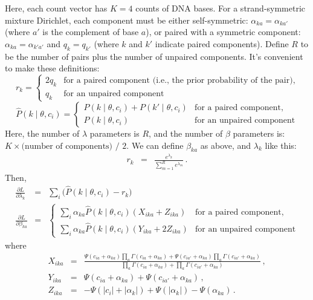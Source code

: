 \documentclass[11pt]{article}
\begin{document}
Here, each count vector has $K=4$ counts of DNA bases.  For a
strand-symmetric mixture Dirichlet, each component must be either
self-symmetric: $\alpha_{ka} = \alpha_{ka'}$ (where $a'$ is the
complement of base $a$), or paired with a symmetric component:
$\alpha_{ka} = \alpha_{k'a'}$ and $q_k = q_{k'}$ (where $k$ and $k'$
indicate paired components).  Define $R$ to be the number of pairs
plus the number of unpaired components.  It's convenient to make these
definitions:
\[
r_k = \begin{cases}
  2 q_k & \text{for a paired component (i.e., the prior probability of the pair),} \\
  q_k   & \text{for an unpaired component}
\end{cases}
\]
\[
\hat{P}(k \mid \theta, c_i) = \begin{cases}
  P(k \mid \theta, c_i) + P(k' \mid \theta, c_i) & \text{for a paired component,}\\
  P(k \mid \theta, c_i) & \text{for an unpaired component}
\end{cases}
\]
Here, the number of $\lambda$ parameters is $R$, and the number of
$\beta$ parameters is: $K \times \text{(number of components) / 2}$.
We can define $\beta_{ka}$ as above, and $\lambda_k$ like this:
\begin{eqnarray*}
  r_k & = & \frac{ e^{\lambda_k} } { \sum_{m=1}^R e^{\lambda_m} } \,.
\end{eqnarray*}
Then,
\begin{eqnarray*}
\frac{\partial L}{\partial \lambda_k} &=& \sum_i \bigl( \hat{P}(k \mid \theta, c_i) - r_k \bigr) \\
\frac{\partial L}{\partial \beta_{ka}} &=&
 \begin{cases}
\sum_i \alpha_{ka} \hat{P}(k \mid \theta, c_i)
    (X_{ika} + Z_{ika}) & \text{for a paired component,} \\
\sum_i \alpha_{ka} \hat{P}(k \mid \theta, c_i)
    (Y_{ika} + 2 Z_{ika}) & \text{for an unpaired component}
    \end{cases}
\end{eqnarray*}
where
\begin{eqnarray*}
X_{ika} & = &
\frac{ \Psi \left( c_{ia} + \alpha_{ka} \right) \prod_a \Gamma \left( c_{ia} + \alpha_{ka} \right) +
       \Psi \left( c_{ia'} + \alpha_{ka} \right) \prod_a \Gamma \left( c_{ia'} + \alpha_{ka} \right) }
     { \prod_a \Gamma \left( c_{ia} + \alpha_{ka} \right) + \prod_a \Gamma \left( c_{ia'} + \alpha_{ka} \right) } \,,\\
Y_{ika} & = & \Psi \left( c_{ia} + \alpha_{ka} \right) + \Psi \left( c_{ia'} + \alpha_{ka} \right) \,,\\
Z_{ika} & = & -  \Psi \left( | c_i | + | \alpha_k | \right)
        +  \Psi \left( | \alpha_k | \right)
        -  \Psi \left( \alpha_{ka} \right) \,.
\end{eqnarray*}
\end{document}
